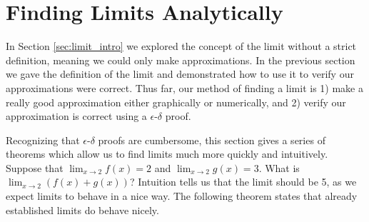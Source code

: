 \section{Finding Limits Analytically}\label{sec:limit_analytically}

%

In Section \ref{sec:limit_intro} we explored the concept of the limit without a strict definition, meaning we could only make approximations. In the previous section we gave the definition of the limit and demonstrated how to use it to verify our approximations were correct. Thus far, our method of finding a limit is 1) make a really good approximation either graphically or numerically, and 2) verify our approximation is correct using a $\epsilon$-$\delta$ proof.

Recognizing that $\epsilon$-$\delta$ proofs are cumbersome, this section gives a series of theorems which allow us to find limits much more quickly and intuitively. \\

Suppose that $\lim_{x\to 2} f(x)=2$ and $\lim_{x\to 2} g(x) = 3$. What is $\lim_{x\to 2}(f(x)+g(x))$? Intuition tells us that the limit should be 5, as we expect limits to behave in a nice way. The following theorem states that already established limits do behave nicely.


